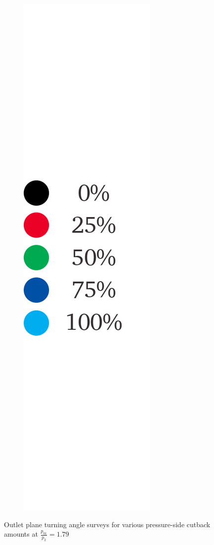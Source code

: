 \documentclass[a4paper, 11pt, oneside]{report}
\begin{document}
\begin{figure}[H]
\begin{subfigure}{.1125\textwidth}
		\includegraphics[width=\linewidth]{figs/ps_cutbacks_turning_angles_survey_legend.png}
	\end{subfigure}
	\caption{Outlet plane turning angle surveys for various pressure-side cutback amounts at $\frac{p_{01}}{p_2}=1.79$}
      \label{fig:ps_cutbacks_turning_angle_surveys}
\end{figure}
\end{document}
